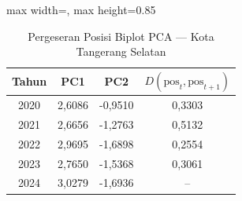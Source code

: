 \begin{table}[H]
\centering
\caption{Pergeseran Posisi Biplot PCA --- Kota Tangerang Selatan} \label{tab:appjarak_pca_skor_kota_tangerang_selatan}
\begin{adjustbox}{max width=\textwidth, max height=0.85\textheight}
\begin{tabular}{|c|c|c|c|}
\hline
\textbf{Tahun} & \textbf{PC1} & \textbf{PC2} & \textbf{$D(\text{pos}_t, \text{pos}_{t+1})$} \\
\hline
2020 & 2,6086 & -0,9510 & 0,3303 \\
2021 & 2,6656 & -1,2763 & 0,5132 \\
2022 & 2,9695 & -1,6898 & 0,2554 \\
2023 & 2,7650 & -1,5368 & 0,3061 \\
2024 & 3,0279 & -1,6936 & -- \\
\hline
\end{tabular}
\end{adjustbox}
\end{table}